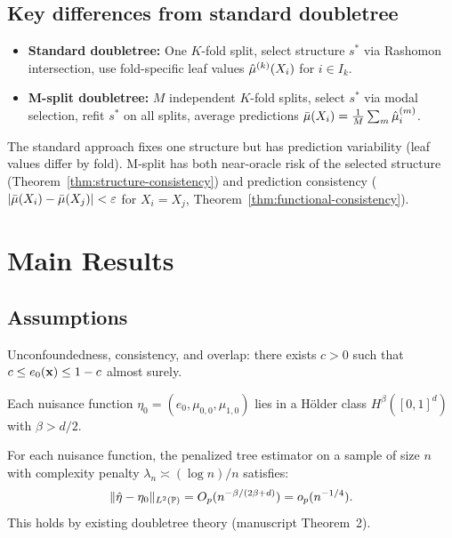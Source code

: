 \documentclass[12pt]{article}
\begin{document}
\subsection{Key differences from standard doubletree}

\begin{itemize}
\item \textbf{Standard doubletree:} One $K$-fold split, select structure $s^*$ via Rashomon intersection, use fold-specific leaf values $\hat{\mu}^{(k)}(X_i)$ for $i \in I_k$.
\item \textbf{M-split doubletree:} $M$ independent $K$-fold splits, select $s^*$ via modal selection, refit $s^*$ on all splits, average predictions $\bar{\mu}(X_i) = \frac{1}{M} \sum_m \hat{\mu}_i^{(m)}$.
\end{itemize}

The standard approach fixes one structure but has prediction variability (leaf values differ by fold). M-split has both near-oracle risk of the selected structure (Theorem~\ref{thm:structure-consistency}) and prediction consistency ($|\bar{\mu}(X_i) - \bar{\mu}(X_j)| < \varepsilon$ for $X_i = X_j$, Theorem~\ref{thm:functional-consistency}).

\section{Main Results}

\subsection{Assumptions}

\begin{assumption}
\label{assump:causal}
Unconfoundedness, consistency, and overlap: there exists $c > 0$ such that $c \le e_0(\mathbf{x}) \le 1 - c$ almost surely.
\end{assumption}

\begin{assumption}
\label{assump:smoothness}
Each nuisance function $\eta_0 = (e_0, \mu_{0,0}, \mu_{1,0})$ lies in a H\"older class $H^\beta([0,1]^d)$ with $\beta > d/2$.
\end{assumption}

\begin{assumption}
\label{assump:tree}
For each nuisance function, the penalized tree estimator on a sample of size $n$ with complexity penalty $\lambda_n \asymp (\log n)/n$ satisfies:
\[
\|\hat\eta - \eta_0\|_{L^2(\mathbb{P})} = O_p(n^{-\beta/(2\beta+d)}) = o_p(n^{-1/4}).
\]
This holds by existing doubletree theory (manuscript Theorem~2).
\end{assumption}
\end{document}
